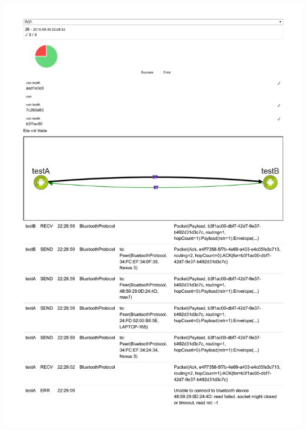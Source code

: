 \includegraphics[trim=0 120 0 0,clip,scale=0.8]{belege/manuelle-tests/netzwerk/Dashboardauszuege/Netzwerktest_IV-1a.pdf}
\clearpage
